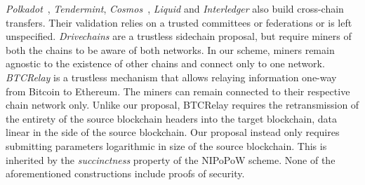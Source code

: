 \emph{Polkadot}~\cite{wood2016polkadot}, \emph{Tendermint},
\emph{Cosmos}~\cite{buchman2016tendermint}, \emph{Liquid} and \emph{Interledger}
also build cross-chain transfers. Their validation relies on a trusted
committees or federations or is left unspecified. \emph{Drivechains} are a
trustless sidechain proposal, but require miners of both the chains to be aware
of both networks. In our scheme, miners remain agnostic to the existence of
other chains and connect only to one network. \emph{BTCRelay} is a trustless
mechanism that allows relaying information one-way from Bitcoin to Ethereum. The
miners can remain connected to their respective chain network only. Unlike our
proposal, BTCRelay requires the retransmission of the entirety of the source
blockchain headers into the target blockchain, data linear in the side of the
source blockchain. Our proposal instead only requires submitting parameters
logarithmic in size of the source blockchain. This is inherited by the
\emph{succinctness} property of the NIPoPoW scheme. None of the aforementioned
constructions include proofs of security.
